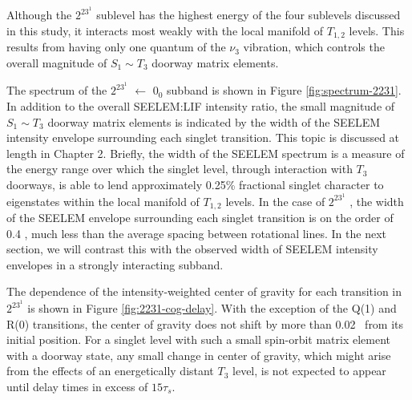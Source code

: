 \documentclass[12pt]{mitthesis}
\begin{document}
Although the $2^23^1$  sublevel has the highest energy of the
four sublevels discussed in this study, it interacts most weakly with
the local manifold of $T_{1,2}$ levels.  This results from having only
one quantum of the $\nu_3$ vibration, which controls the overall
magnitude of $S_1 \sim T_3$ doorway matrix elements.

The spectrum of the $2^23^1$  $\leftarrow$ $0_0$ subband is
shown in Figure \ref{fig:spectrum-2231}.  In addition to the overall
SEELEM:LIF intensity ratio, the small magnitude of $S_1 \sim T_3$
doorway matrix elements is indicated by the width of the SEELEM
intensity envelope surrounding each singlet transition.  This topic is
discussed at length in Chapter 2.  Briefly, the width of the SEELEM
spectrum is a measure of the energy range over which the singlet
level, through interaction with $T_3$ doorways, is able to lend
approximately 0.25\% fractional singlet character to eigenstates
within the local manifold of $T_{1,2}$ levels.  In the case of
$2^23^1$ , the width of the SEELEM envelope surrounding each
singlet transition is on the order of 0.4 \rcm, much less than the
average spacing between rotational lines.  In the next section, we
will contrast this with the observed width of SEELEM intensity
envelopes in a strongly interacting subband.


The dependence of the intensity-weighted center of gravity for each
transition in $2^23^1$  is shown in Figure
\ref{fig:2231-cog-delay}.  With the exception of the Q(1) and R(0)
transitions, the center of gravity does not shift by more than 0.02
\rcm\ from its initial position.  For a singlet level with such a
small spin-orbit matrix element with a doorway state, any small change
in center of gravity, which might arise from the effects of an
energetically distant $T_3$ level, is not expected to appear until
delay times in excess of $15\tau_s$.
\end{document}
